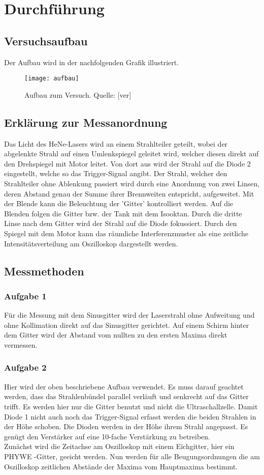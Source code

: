 \clearpage
\section{Durchführung}
\subsection{Versuchsaufbau}
Der Aufbau wird in der nachfolgenden Grafik illustriert.
\begin{figure}[h]
\begin{center}
\texttt{[image: aufbau]}
\caption{Aufbau zum Versuch. Quelle: [ver]}
\label{fig:aufbau}
\end{center}
\end{figure}
\clearpage
\subsection{Erklärung zur Messanordnung}
Das Licht des HeNe-Lasers wird an einem Strahlteiler geteilt, wobei der abgelenkte Strahl auf einen Umlenkspiegel geleitet wird, welcher diesen direkt auf den Drehspiegel mit Motor leitet. Von dort aus wird der Strahl auf die Diode 2 eingestellt, welche so das Trigger-Signal angibt. Der Strahl, welcher den Strahlteiler ohne Ablenkung passiert wird durch eine Anordnung von zwei Linsen, deren Abstand genau der Summe ihrer Brennweiten entspricht, aufgeweitet. Mit der Blende kann die Beleuchtung der 'Gitter' kontrolliert werden. Auf die Blenden folgen die Gitter bzw. der Tank mit dem Isooktan. Durch die dritte Linse nach dem Gitter wird der Strahl auf die Diode fokussiert. Durch den Spiegel mit dem Motor kann das räumliche Interferenzmuster als eine zeitliche Intensitätsverteilung am Oszilloskop dargestellt werden.
\subsection{Messmethoden}
\subsubsection*{Aufgabe 1}
Für die Messung mit dem Sinusgitter wird der Laserstrahl ohne Aufweitung und ohne Kollimation direkt auf das Sinusgitter gerichtet. Auf einem Schirm hinter dem Gitter wird der Abstand vom nullten zu den ersten Maxima direkt vermessen.
\subsubsection*{Aufgabe 2}
Hier wird der oben beschriebene Aufbau verwendet. Es muss darauf geachtet werden, dass das Strahlenbündel parallel verläuft und senkrecht auf das Gitter trifft. Es werden hier nur die Gitter benutzt und nicht die Ultraschallzelle.
Damit Diode 1 nicht auch noch das Trigger-Signal erfasst werden die beiden Strahlen in der Höhe schoben. Die Dioden werden in der Höhe ihrem Strahl angepasst. Es genügt den Verstärker auf eine 10-fache Verstärkung zu betreiben.\\
Zunächst wird die Zeitachse am Oszilloskop mit einem Eichgitter, hier ein PHYWE -Gitter, geeicht werden. Nun werden für alle Beugungsordnungen die am Oszilloskop zeitlichen Abstände der Maxima vom Hauptmaxima bestimmt.
